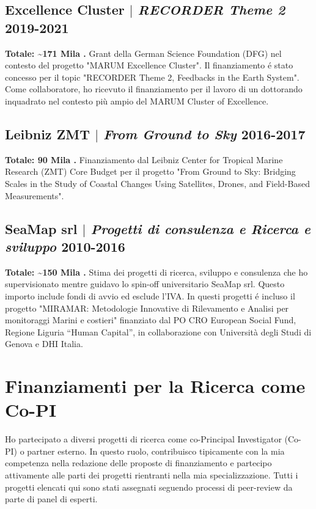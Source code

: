 \documentclass[11pt]{article}
\begin{document}
\subsection{Excellence Cluster $|$ {\normalfont\textit{RECORDER Theme 2}} \hfill 2019-2021}
{\footnotesize \textbf{Totale: \textasciitilde171 Mila \texteuro.} Grant della German Science Foundation (DFG) nel contesto del progetto "MARUM Excellence Cluster". Il finanziamento é stato concesso per il topic "RECORDER Theme 2, Feedbacks in the Earth System". Come collaboratore, ho ricevuto il finanziamento per il lavoro di un dottorando inquadrato nel contesto più ampio del MARUM Cluster of Excellence.}
\bigskip

\subsection{Leibniz ZMT $|$ {\normalfont\textit{From Ground to Sky}} \hfill 2016-2017}
{\footnotesize \textbf{Totale: 90 Mila \texteuro.} Finanziamento dal Leibniz Center for Tropical Marine Research (ZMT) Core Budget per il progetto "From Ground to Sky: Bridging Scales in the Study of Coastal Changes Using Satellites, Drones, and Field-Based Measurements".}
\bigskip

\subsection{SeaMap srl $|$ {\normalfont\textit{Progetti di consulenza e Ricerca e sviluppo}} \hfill 2010-2016}
{\footnotesize \textbf{Totale: \textasciitilde150 Mila \texteuro.} Stima dei progetti di ricerca, sviluppo e consulenza che ho supervisionato mentre guidavo lo spin-off universitario SeaMap srl. Questo importo include fondi di avvio ed esclude l'IVA. In questi progetti é incluso il progetto "MIRAMAR: Metodologie Innovative di Rilevamento e Analisi per monitoraggi Marini e costieri" finanziato dal PO CRO European Social Fund, Regione Liguria “Human Capital”, in collaborazione con Università degli Studi di Genova e DHI Italia.}

\newpage
\section{Finanziamenti per la Ricerca come Co-PI}
{\normalfont Ho partecipato a diversi progetti di ricerca come co-Principal Investigator (Co-PI) o partner esterno. In questo ruolo, contribuisco tipicamente con la mia competenza nella redazione delle proposte di finanziamento e partecipo attivamente alle parti dei progetti rientranti nella mia specializzazione. Tutti i progetti elencati qui sono stati assegnati seguendo processi di peer-review da parte di panel di esperti.}\\
\end{document}

